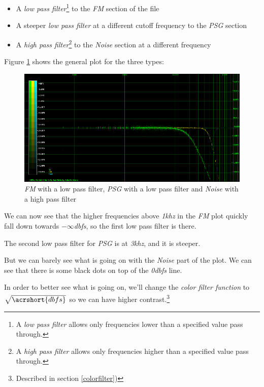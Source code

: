 \documentclass[10pt,a4paper]{report}
\newcommand{\fkhz}[1]{\textit{#1\acrshort{khz}}}
\newcommand{\db}[1]{\textit{#1\acrshort{dbfs}}}
\begin{document}
\begin{itemize}
	\item A \textit{low pass filter}\footnote{A \textit{low pass filter} allows only frequencies lower than a specified value pass through.} to the \textit{FM} section of the file
	\item A steeper \textit{low pass filter} at a different cutoff frequency to the \textit{PSG} section
	\item A \textit{high pass filter}\footnote{A \textit{high pass filter} allows only frequencies higher than a specified value pass through.} to the \textit{Noise} section at a different frequency
\end{itemize}

Figure \ref{fig:plot4-1-all} shows the general plot for the three types:

\begin{figure}[H]
	\centering
	\includegraphics[width=1.0\linewidth]{images/interpretation/Plot4-1-All.png}
	\caption[All Plotted]{\textit{FM} with a low pass filter, \textit{PSG} with a low pass filter and \textit{Noise} with a high pass filter}
	\label{fig:plot4-1-all}
\end{figure}

We can now see that the higher frequencies above \fkhz{1} in the \textit{FM} plot quickly fall down towards \db{$-\infty$}, so the first low pass filter is there.

The second low pass filter for \textit{PSG} is at \fkhz{3}, and it is steeper.

But we can barely see what is going on with the \textit{Noise} part of the plot. We can see that there is some black dots on top of the \db{0} line.

In order to better see what is going on, we'll change the \textit{color filter function} to $\sqrt{\acrshort{dbfs}}$ so we can have higher contrast.\footnote{Described in section \ref{colorfilter})}
\end{document}
